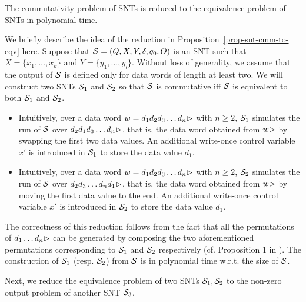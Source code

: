 \vspace{-1mm}
\begin{proposition}\label{prop-snt-cmm-to-eqv}
The commutativity problem of SNTs is reduced to the equivalence problem of SNTs in polynomial time.
\end{proposition}

We briefly describe the idea of the reduction in Proposition~\ref{prop-snt-cmm-to-eqv} here. Suppose that ${\mathcal{S} }=(Q, X, Y, \delta, q_0, O)$ is an SNT such that $X=\{x_1,\dots,x_k\}$ and $Y=\{y_1,\dots,y_l\}$. Without loss of generality, we assume that the output of ${\mathcal{S} }$ is defined only for data words of length at least two. We will construct two SNTs ${\mathcal{S} }_1$ and ${\mathcal{S} }_2$ so that ${\mathcal{S} }$ is commutative iff ${\mathcal{S} }$ is equivalent to both ${\mathcal{S} }_1$ and ${\mathcal{S} }_2$.
\begin{itemize}
\item Intuitively, over a data word $w=d_1 d_2 d_3 \dots d_n\rhd$ with $n\ge 2$, ${\mathcal{S} }_1$ simulates the run of ${\mathcal{S} }$ over $d_2 d_1 d_3 \dots d_n\rhd$, that is, the data word obtained from $w\rhd$ by swapping the first two data values. An additional write-once control variable $x'$ is introduced in ${\mathcal{S} }_1$ to store the data value $d_1$.
%
\item Intuitively, over a data word $w=d_1 d_2 d_3 \dots d_n\rhd$ with $n\ge 2$, ${\mathcal{S} }_2$ simulates the run of ${\mathcal{S} }$ over $d_2 d_3 \dots d_n d_1\rhd$, that is, the data word obtained from $w\rhd$ by moving the first data value to the end. An additional write-once control variable $x'$ is introduced in ${\mathcal{S} }_2$ to store the data value $d_1$.
\end{itemize}
The correctness of this reduction follows from the fact that all the permutations of $d_1\dots d_n\rhd$ can be generated by composing the two aforementioned permutations corresponding to ${\mathcal{S} }_1$ and ${\mathcal{S} }_2$ respectively (cf. Proposition 1 in \cite{CHSW15}). The construction of ${\mathcal{S} }_1$ (resp. ${\mathcal{S} }_2$) from ${\mathcal{S} }$ is in  polynomial time w.r.t. the size of ${\mathcal{S} }$.

Next, we reduce the equivalence problem of two SNTs ${\mathcal{S} }_1, {\mathcal{S} }_2$ to the non-zero output problem of another SNT ${\mathcal{S} }_3$. 

